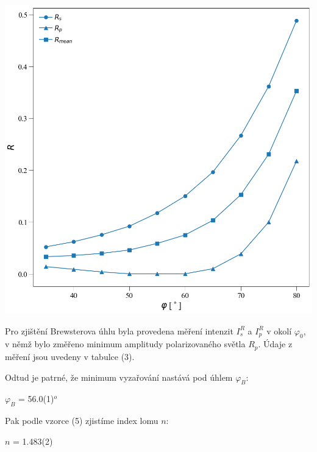 \documentclass[a4paper,11pt]{article}
\begin{document}
\begin{minipage}[t]{0.5\textwidth}
                \par \centering
                \vspace{10pt}
                \includegraphics[scale=0.3]{amplituda}
                \captionsetup{justification=centering, font=footnotesize}
                \label{fig:amplituda}
                \raggedright
                \vspace{10pt}
                \par Pro zjištění Brewsterova úhlu byla provedena měření intenzit $I_s^R$ a $I_p^R$ v okolí $\varphi_0$, v němž bylo změřeno minimum amplitudy polarizovaného světla $R_p$. Údaje z měření jsou uvedeny v tabulce (3).
                \par Odtud je patrné, že minimum vyzařování nastává pod úhlem $\varphi_B$: 
                \begin{center}
                    $\varphi_B$ = 56.0(1)$^o$
                \end{center}
                Pak podle vzorce (5) zjistíme index lomu $n$: 
                \begin{center}
                    $n$ = 1.483(2)
                \end{center}
    \end{minipage}
\end{document}
